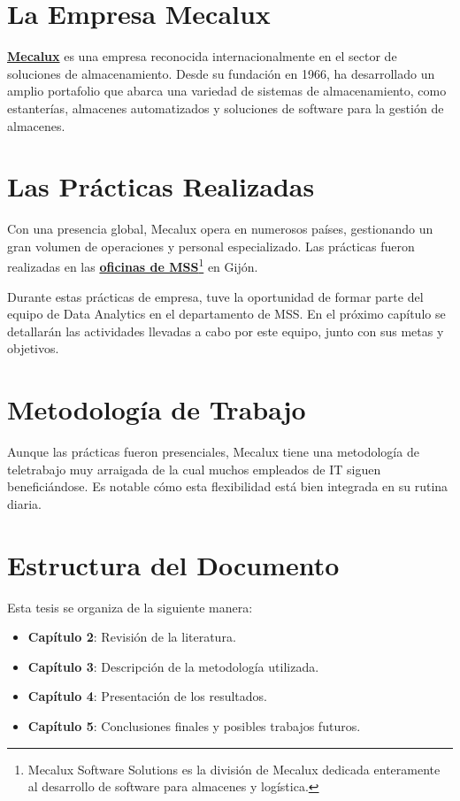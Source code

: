 

\section{La Empresa Mecalux}
\href{https://www.mecalux.es/}{\textbf{Mecalux}} es una empresa reconocida internacionalmente en el sector de soluciones de almacenamiento. Desde su fundación en 1966, ha desarrollado un amplio portafolio que abarca una variedad de sistemas de almacenamiento, como estanterías, almacenes automatizados y soluciones de software para la gestión de almacenes.

\section{Las Prácticas Realizadas}
Con una presencia global, Mecalux opera en numerosos países, gestionando un gran volumen de operaciones y personal especializado. Las prácticas fueron realizadas en las \href{https://maps.app.goo.gl/bJKvSNHAo5t1j4BZ6}{\textbf{oficinas de MSS}}\footnote{Mecalux Software Solutions es la división de Mecalux dedicada enteramente al desarrollo de software para almacenes y logística.} en Gijón.

Durante estas prácticas de empresa, tuve la oportunidad de formar parte del equipo de Data Analytics en el departamento de MSS. En el próximo capítulo se detallarán las actividades llevadas a cabo por este equipo, junto con sus metas y objetivos.

\section{Metodología de Trabajo}
Aunque las prácticas fueron presenciales, Mecalux tiene una metodología de teletrabajo muy arraigada de la cual muchos empleados de IT siguen beneficiándose. Es notable cómo esta flexibilidad está bien integrada en su rutina diaria.

\section{Estructura del Documento}
Esta tesis se organiza de la siguiente manera:
\begin{itemize}
    \item \textbf{Capítulo 2}: Revisión de la literatura.
    \item \textbf{Capítulo 3}: Descripción de la metodología utilizada.
    \item \textbf{Capítulo 4}: Presentación de los resultados.
    \item \textbf{Capítulo 5}: Conclusiones finales y posibles trabajos futuros.
\end{itemize}

